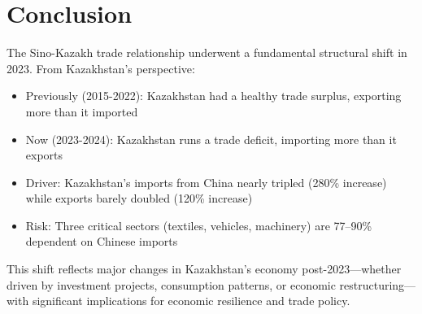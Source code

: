 \documentclass[12pt]{article}
\begin{document}
\section{Conclusion}

The Sino-Kazakh trade relationship underwent a fundamental structural shift in 2023. From Kazakhstan's perspective:
\begin{itemize}
\item Previously (2015-2022): Kazakhstan had a healthy trade surplus, exporting more than it imported
\item Now (2023-2024): Kazakhstan runs a trade deficit, importing more than it exports
\item Driver: Kazakhstan's imports from China nearly tripled (280\% increase) while exports barely doubled (120\% increase)
\item Risk: Three critical sectors (textiles, vehicles, machinery) are 77--90\% dependent on Chinese imports
\end{itemize}

This shift reflects major changes in Kazakhstan's economy post-2023---whether driven by investment projects, consumption patterns, or economic restructuring---with significant implications for economic resilience and trade policy.
\end{document}
